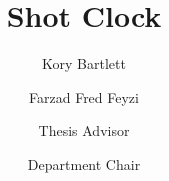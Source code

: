 \documentclass{scu-thesis}
\author{Kory Bartlett}
\author{Farzad Fred Feyzi}
\title{Shot Clock}
\begin{document}
\frontmatter
\signature{Thesis Advisor}
\signature{Department Chair}

\maketitle


\tableofcontents
\listoffigures

\mainmatter














\backmatter
\end{document}
